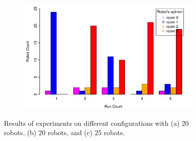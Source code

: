 \documentclass{llncs}
\begin{document}
\begin{figure}[h!]
\begin{subfigure}[b]{0.67\textwidth}
                \includegraphics[width=\textwidth]{PLOT/EXP/exp3}
                \label{fig:exp1}
        \end{subfigure}
        
	\caption{Results of experiments on different configurations with (a) 20 robots, (b) 20 robots, and (c) 25 robots.}\label{fig:plots123}
	\end{figure}
	
\end{document}
